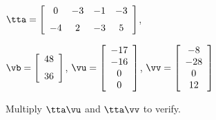 {$\tta = \left[ \begin {array}{cccc} 0 & -3 & -1 & -3 \\ \noalign{\medskip} -4 & 2 & -3 & 5 \end {array} \right] $, 

$\vb=\left[ \begin {array}{c} 48\\ \noalign{\medskip}36 \end {array} \right] $, 
$\vu = \left[ \begin {array}{c} -17 \\ -16 \\ 0 \\ 0 \end{array} \right]$, 
$\vv = \left[ \begin{array}{c} -8\\ -28\\ 0 \\ 12 \end{array} \right] $}
{Multiply $\tta\vu$ and $\tta\vv$ to verify.}





